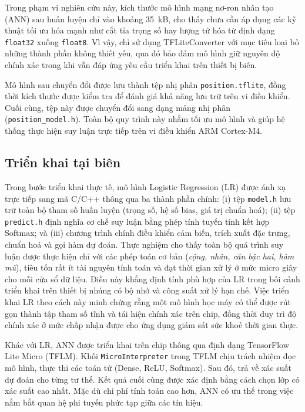 Trong phạm vi nghiên cứu này, kích thước mô hình mạng nơ-ron nhân tạo (ANN) sau
huấn luyện chỉ vào khoảng 35~kB, cho thấy chưa cần áp dụng các kỹ thuật tối ưu
hóa mạnh như cắt tỉa trọng số hay lượng tử hóa từ định dạng \texttt{float32}
xuống \texttt{float8}. Vì vậy, chỉ sử dụng TFLiteConverter với mục tiêu loại bỏ
những thành phần không thiết yếu, qua đó bảo đảm mô hình giữ nguyên độ chính
xác trong khi vẫn đáp ứng yêu cầu triển khai trên thiết bị biên.

Mô hình sau chuyển đổi được lưu thành tệp nhị phân \texttt{position.tflite},
đồng thời kích thước được kiểm tra để đánh giá khả năng lưu trữ trên vi điều
khiển. Cuối cùng, tệp này được chuyển đổi sang dạng mảng nhị phân
(\texttt{position\_model.h}). Toàn bộ quy trình này nhằm tối ưu mô hình và giúp
hệ thống thực hiện suy luận trực tiếp trên vi điều khiển ARM Cortex-M4.

\subsection{Triển khai tại biên}

Trong bước triển khai thực tế, mô hình Logistic Regression (LR) được ánh xạ
trực tiếp sang mã C/C++ thông qua ba thành phần chính: (i) tệp \texttt{model.h}
lưu trữ toàn bộ tham số huấn luyện (trọng số, hệ số bias, giá trị chuẩn hoá);
(ii) tệp \texttt{predict.h} định nghĩa cơ chế suy luận bằng phép tính tuyến
tính kết hợp Softmax; và (iii) chương trình chính điều khiển cảm biến, trích
xuất đặc trưng, chuẩn hoá và gọi hàm dự đoán. Thực nghiệm cho thấy toàn bộ quá
trình suy luận được thực hiện chỉ với các phép toán cơ bản (\emph{cộng, nhân,
    căn bậc hai, hàm mũ}), tiêu tốn rất ít tài nguyên tính toán và đạt thời gian xử
lý ở mức micro giây cho mỗi cửa sổ dữ liệu. Điều này khẳng định tính phù hợp
của LR trong bối cảnh triển khai trên thiết bị nhúng có bộ nhớ và công suất xử
lý hạn chế. Việc triển khai LR theo cách này minh chứng rằng một mô hình học
máy có thể được rút gọn thành tập tham số tĩnh và tái hiện chính xác trên chip,
đồng thời duy trì độ chính xác ở mức chấp nhận được cho ứng dụng giám sát sức
khoẻ thời gian thực.

Khác với LR, ANN được triển khai trên chip thông qua định dạng TensorFlow Lite
Micro (TFLM). Khối \texttt{MicroInterpreter} trong TFLM chịu trách nhiệm đọc mô
hình, thực thi các toán tử (Dense, ReLU, Softmax). Sau đó, trả về xác suất dự
đoán cho từng tư thế. Kết quả cuối cùng được xác định bằng cách chọn lớp có xác
suất cao nhất. Mặc dù chi phí tính toán cao hơn, ANN có ưu thế trong việc nắm
bắt quan hệ phi tuyến phức tạp giữa các tín hiệu.

